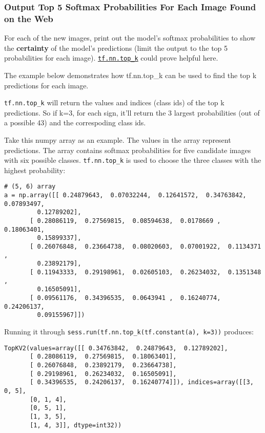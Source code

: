 \documentclass[11pt]{article}
\begin{document}
    \hypertarget{output-top-5-softmax-probabilities-for-each-image-found-on-the-web}{%
\subsubsection{Output Top 5 Softmax Probabilities For Each Image Found
on the
Web}\label{output-top-5-softmax-probabilities-for-each-image-found-on-the-web}}

    For each of the new images, print out the model's softmax probabilities
to show the \textbf{certainty} of the model's predictions (limit the
output to the top 5 probabilities for each image).
\href{https://www.tensorflow.org/versions/r0.12/api_docs/python/nn.html\#top_k}{\texttt{tf.nn.top\_k}}
could prove helpful here.

The example below demonstrates how tf.nn.top\_k can be used to find the
top k predictions for each image.

\texttt{tf.nn.top\_k} will return the values and indices (class ids) of
the top k predictions. So if k=3, for each sign, it'll return the 3
largest probabilities (out of a possible 43) and the correspoding class
ids.

Take this numpy array as an example. The values in the array represent
predictions. The array contains softmax probabilities for five candidate
images with six possible classes. \texttt{tf.nn.top\_k} is used to
choose the three classes with the highest probability:

\begin{verbatim}
# (5, 6) array
a = np.array([[ 0.24879643,  0.07032244,  0.12641572,  0.34763842,  0.07893497,
         0.12789202],
       [ 0.28086119,  0.27569815,  0.08594638,  0.0178669 ,  0.18063401,
         0.15899337],
       [ 0.26076848,  0.23664738,  0.08020603,  0.07001922,  0.1134371 ,
         0.23892179],
       [ 0.11943333,  0.29198961,  0.02605103,  0.26234032,  0.1351348 ,
         0.16505091],
       [ 0.09561176,  0.34396535,  0.0643941 ,  0.16240774,  0.24206137,
         0.09155967]])
\end{verbatim}

Running it through \texttt{sess.run(tf.nn.top\_k(tf.constant(a),\ k=3))}
produces:

\begin{verbatim}
TopKV2(values=array([[ 0.34763842,  0.24879643,  0.12789202],
       [ 0.28086119,  0.27569815,  0.18063401],
       [ 0.26076848,  0.23892179,  0.23664738],
       [ 0.29198961,  0.26234032,  0.16505091],
       [ 0.34396535,  0.24206137,  0.16240774]]), indices=array([[3, 0, 5],
       [0, 1, 4],
       [0, 5, 1],
       [1, 3, 5],
       [1, 4, 3]], dtype=int32))
\end{verbatim}
\end{document}
